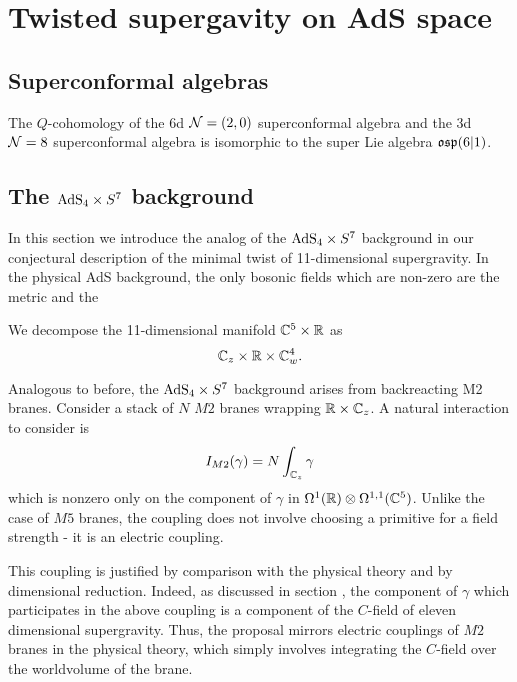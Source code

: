 \section{Twisted supergavity on AdS space}


\subsection{Superconformal algebras}

\begin{prop}
The $Q$-cohomology of the 6d $\mathcal N=(2,0)$ superconformal algebra and the 3d $\mathcal N=8$ superconformal algebra is isomorphic to the super Lie algebra $\mathfrak{osp}(6|1)$. 
\end{prop} 

\subsection{The ${\rm AdS}_4 \times S^7$ background}

In this section we introduce the analog of the ${\rm AdS}_4 \times S^7$ background in our conjectural description of the minimal twist of 11-dimensional supergravity. 
In the physical AdS background, the only bosonic fields which are non-zero are the metric and the 

\parsec[]

We decompose the 11-dimensional manifold $\mathbb C^5 \times \mathbb R$ as
\[
\mathbb C_z \times \mathbb R \times \mathbb C^4_w .
\]

Analogous to before, the ${\rm AdS}_4 \times S^7$ background arises from backreacting M2 branes. Consider a stack of $N$ $M2$ branes wrapping $\mathbb{R}\times \mathbb{C}_z$. A natural interaction to consider is 
\[
I_{M2}(\gamma) = N\int_{\mathbb{C}_z} \gamma
\] 
which is nonzero only on the component of $\gamma$ in $\Omega^1(\mathbb{R})\otimes \Omega^{1,1}(\mathbb{C}^5)$. Unlike the case of $M5$ branes, the coupling does not involve choosing a primitive for a field strength - it is an electric coupling.

This coupling is justified by comparison with the physical theory and by dimensional reduction. 
Indeed, as discussed in section \surya{}, the component of $\gamma$ which participates in the above coupling is a component of the $C$-field of eleven dimensional supergravity. Thus, the proposal mirrors electric couplings of $M2$ branes in the physical theory, which simply involves integrating the $C$-field over the worldvolume of the brane. 

